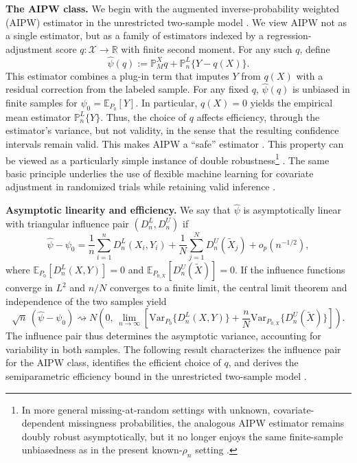 \documentclass{article}
\theoremstyle{plain}
\theoremstyle{definition}
\newcommand{\E}{\mathbb{E}}
\newcommand{\Var}{\mathrm{Var}}
\newcommand{\R}{\mathbb{R}}
\newcommand{\1}{\mathbf{1}}
\newcommand{\Pl}{\mathbb{P}^{L}_n}
\newcommand{\Pmx}{\mathbb{P}^{X}_M}
\newcommand{\Px}{P_{0,X}}
\begin{document}
\textbf{The AIPW class.} We begin with the augmented inverse-probability weighted (AIPW) estimator in the unrestricted two-sample model \citep{robins1994estimation}. We view AIPW not as a single estimator, but as a family of estimators indexed by a regression-adjustment score \(q:\mathcal X\to\R\) with finite second moment. For any such \(q\), define
\begin{equation}
\label{eq:aipw-family}
\widehat\psi(q)
:=
\Pmx q+\Pl\{Y-q(X)\}.
\end{equation}
This estimator combines a plug-in term that imputes \(Y\) from \(q(X)\) with a residual correction from the labeled sample. For any fixed \(q\), \(\widehat\psi(q)\) is unbiased in finite samples for \(\psi_0=\E_{P_0}[Y]\). In particular, \(q(X)=0\) yields the empirical mean estimator \(\mathbb{P}_n^L\{Y\}\). Thus, the choice of \(q\) affects efficiency, through the estimator's variance, but not validity, in the sense that the resulting confidence intervals remain valid. This makes AIPW a ``safe'' estimator \citep{xu2025unified}. This property can be viewed as a particularly simple instance of double robustness\footnote{In more general missing-at-random settings with unknown, covariate-dependent missingness probabilities, the analogous AIPW estimator remains doubly robust asymptotically, but it no longer enjoys the same finite-sample unbiasedness as in the present known-\(\rho_n\) setting \citep{seaman2018introduction}.} \citep{bang2005doubly}. The same basic principle underlies the use of flexible machine learning for covariate adjustment in randomized trials while retaining valid inference \citep{moore2009covariate,moore2009increasing,schuler2022increasing,hojbjerre2025powering}.

\textbf{Asymptotic linearity and efficiency.} We say that
$\widehat\psi$ is asymptotically linear with triangular influence
pair $(D_n^L,D_n^U)$ if
\[
\widehat\psi-\psi_0
=
\frac{1}{n}\sum_{i=1}^n D_n^L(X_i,Y_i)
+
\frac{1}{N}\sum_{j=1}^N D_n^U(\widetilde X_j)
+
o_p(n^{-1/2}),
\]
where $\E_{P_0}[D_n^L(X,Y)]=0$ and
$\E_{\Px}[D_n^U(\widetilde X)]=0$.
If the influence functions converge in $L^2$ and $n/N$ converges
to a finite limit, the central limit theorem and independence
of the two samples yield
\[
\sqrt n\,(\widehat\psi-\psi_0)
\rightsquigarrow
N\!\left(0,\,
\lim_{n\to\infty}\left[
\Var_{P_0}\{D_n^L(X,Y)\}
+
\frac{n}{N}\Var_{\Px}\{D_n^U(\widetilde X)\}
\right]\right).
\]
The influence pair thus determines the asymptotic variance,
accounting for variability in both samples. The following
result characterizes the influence pair for the AIPW class,
identifies the efficient choice of $q$, and derives the
semiparametric efficiency bound in the unrestricted two-sample
model \citep{bickel1993efficient,robins1994estimation,robins1995semiparametric}.
\end{document}
